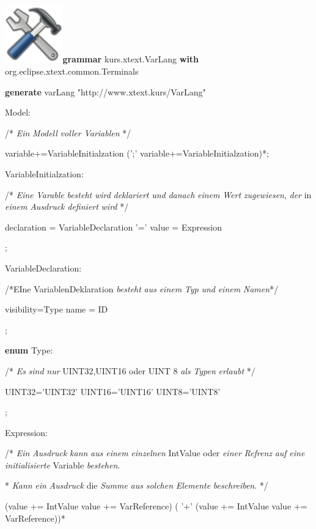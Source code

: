 \documentclass[]{article}
\begin{document}
\includegraphics[width=0.98350in,height=0.98350in]{./Pictures/1000020100000080000000807EA91CDFA7B7F397.png}\textbf{grammar}
kurs.xtext.VarLang \textbf{with} org.eclipse.xtext.common.Terminals

\textbf{generate} varLang "http://www.xtext.kurs/VarLang"

Model:

/* \emph{Ein} \emph{Modell} \emph{voller} \emph{Variablen} */

variable+=VariableInitialzation (';' variable+=VariableInitialzation)*;

VariableInitialzation:

/* \emph{Eine} \emph{Varable} \emph{besteht} \emph{wird}
\emph{deklariert} \emph{und} \emph{danach} \emph{einem} \emph{Wert}
\emph{zugewiesen}, \emph{der} in \emph{einem} \emph{Ausdruck}
\emph{definiert} \emph{wird} */

declaration = VariableDeclaration '=' value = Expression

;

VariableDeclaration:

/*EIne VariablenDeklaration \emph{besteht} \emph{aus} \emph{einem}
\emph{Typ} \emph{und} \emph{einem} \emph{Namen}*/

visibility=Type name = ID

;

\textbf{enum} Type:

/* \emph{Es} \emph{sind} \emph{nur} UINT32,UINT16 oder UINT 8 \emph{als}
\emph{Typen} \emph{erlaubt} */

UINT32='UINT32' \textbar{} UINT16='UINT16' \textbar{} UINT8='UINT8'

;

Expression:

/* \emph{Ein} \emph{Ausdruck} \emph{kann} \emph{aus} \emph{einem}
\emph{einzelnen} IntValue oder \emph{einer} \emph{Refrenz} \emph{auf}
\emph{eine} \emph{initialisierte} Variable \emph{bestehen}.

* \emph{Kann} \emph{ein} \emph{Ausdruck} die \emph{Summe} \emph{aus}
\emph{solchen} \emph{Elemente} \emph{beschreiben}. */

(value += IntValue \textbar{} value += VarReference) ( '+' (value +=
IntValue \textbar{} value += VarReference))*
\end{document}
